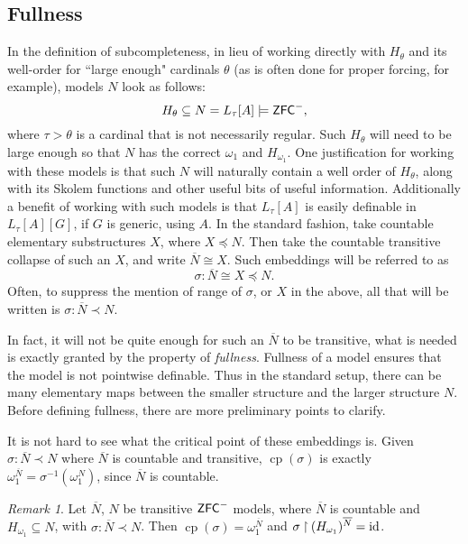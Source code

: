 \documentclass{amsart}
\theoremstyle{definition}
\theoremstyle{remark}
\newtheorem{remark}[theorem]{Remark}
\newcommand{\N}{{\overline{N}}}
\newcommand{\ZFC}{\textup{\ensuremath{\textsf{ZFC}}}}
\newcommand{\id}{\textup{\ensuremath{\text{id}}}}
\DeclareMathOperator{\cp}{cp}
\newcommand{\rest}{\mathbin{\upharpoonright}}
\newcommand{\TC}[1]{\mathrm{TC}(\{ #1 \})}
\begin{document}
\subsection{Fullness}
\label{subsec:fullness}
In the definition of subcompleteness, in lieu of working directly with $H_\theta$ and its well-order for ``large enough" cardinals $\theta$ (as is often done for proper forcing, for example), models $N$ look as follows: 
	$$H_\theta \subseteq N = L_\tau[A] \models \ZFC^-,$$
where $\tau>\theta$ is a cardinal that is not necessarily regular. Such $H_\theta$ will need to be large enough so that $N$ has the correct $\omega_1$ and $H_{\omega_1}$. One justification for working with these models is that such $N$ will naturally contain a well order of $H_\theta$, along with its Skolem functions and other useful bits of useful information. Additionally a benefit of working with such models is that $L_\tau[A]$ is easily definable in $L_\tau[A][G]$, if $G$ is generic, using $A$.
In the standard fashion, take countable elementary substructures $X$, where $X \preccurlyeq N$. Then take the countable transitive collapse of such an $X$, and write $\N \cong X$. Such embeddings will be referred to as $$\sigma: \N \cong X \preccurlyeq N.$$
Often, to suppress the mention of range of $\sigma$, or $X$ in the above, all that will be written is $\sigma: \N \prec N$.
	
In fact, it will not be quite enough for such an $\N$ to be transitive, what is needed is exactly granted by the property of \textit{fullness}. Fullness of a model ensures that the model is not pointwise definable. Thus in the standard setup, there can be many elementary maps between the smaller structure and the larger structure $N$. Before defining fullness, there are more preliminary points to clarify.

It is not hard to see what the critical point of these embeddings is. Given $\sigma: \N \prec N$ where $\N$ is countable and transitive, $\cp(\sigma)$ is exactly $\omega_1^{\N} = \sigma^{-1}(\omega_1^N)$, since $\N$ is countable.

\begin{remark} \label{remark:CPofourEmbeddings} Let $\N$, $N$ be transitive $\ZFC^-$ models, where $\N$ is countable and $H_{\omega_1} \subseteq N$, with $\sigma: \N \prec N$. Then $\cp(\sigma)=\omega_1^{\N}$ and $\sigma \rest (H_{\omega_1})^{\N} = \id$. \end{remark}
%
\end{document}
